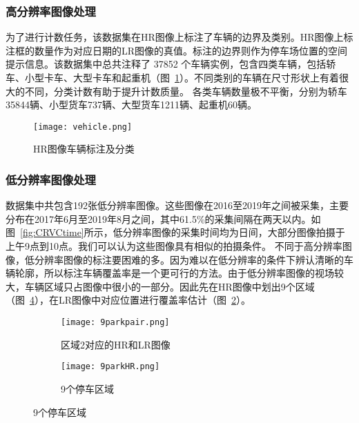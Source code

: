 \subsubsection{高分辨率图像处理}  
为了进行计数任务，该数据集在HR图像上标注了车辆的边界及类别。HR图像上标注框的数量作为对应日期的LR图像的真值。标注的边界则作为停车场位置的空间提示信息。该数据集中总共注释了 37852 个车辆实例，包含四类车辆，包括轿车、小型卡车、大型卡车和起重机（图~\ref{fig:vehicle}）。不同类别的车辆在尺寸形状上有着很大的不同，分类计数有助于提升计数质量。  各类车辆数量极不平衡，分别为轿车35844辆、小型货车737辆、大型货车1211辆、起重机60辆。 
\begin{figure}[h]
    \centering
    \texttt{[image: vehicle.png]}
    \caption{HR图像车辆标注及分类}
    \label{fig:vehicle}
\end{figure}

\subsubsection{低分辨率图像处理}  
数据集中共包含192张低分辨率图像。这些图像在2016至2019年之间被采集，主要分布在2017年6月至2019年8月之间，其中61.5\%的采集间隔在两天以内。如图~\ref{fig:CRVCtime}所示，低分辨率图像的采集时间均为日间，大部分图像拍摄于上午9点到10点。我们可以认为这些图像具有相似的拍摄条件。
不同于高分辨率图像，低分辨率图像的标注要困难的多。因为难以在低分辨率的条件下辨认清晰的车辆轮廓，所以标注车辆覆盖率是一个更可行的方法。由于低分辨率图像的视场较大，车辆区域只占图像中很小的一部分。因此先在HR图像中划出9个区域（图~\ref{fig:9parkHR}），在LR图像中对应位置进行覆盖率估计（图~\ref{fig:9parkpair}）。
\begin{figure}[h]
    \centering
    \begin{subfigure}{0.45\textwidth}
        \texttt{[image: 9parkpair.png]}
        \caption{区域2对应的HR和LR图像}
        \label{fig:9parkpair}
    \end{subfigure}
    \begin{subfigure}{0.45\textwidth}
      \texttt{[image: 9parkHR.png]}
      \caption{9个停车区域}
      \label{fig:9parkHR}
    \end{subfigure}\quad %
    
\end{figure}

    
